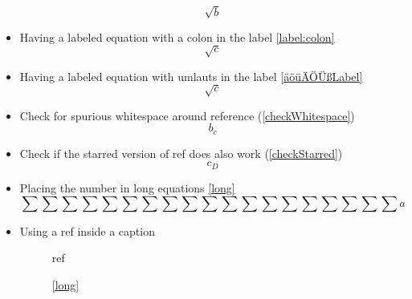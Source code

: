 \documentclass{article}
\def\ifautonum#1{#1}%
\def\ifautonum#1{}%
\def\ifcleveref#1{#1}%
\def\ifcleveref#1{}%
\begin{document}
\begin{itemize}
			\begin{equation}\label{äöüÄÖÜß?:, 3075µ!/§}
				\sqrt{b}
			\end{equation}
		\item Having a labeled equation with a colon in the label \ref{label:colon}
			\begin{equation}\label{label:colon}
				\sqrt{c}
			\end{equation}
		\item Having a labeled equation with umlauts in the label \ref{äöüÄÖÜßLabel}
			\begin{equation}\label{äöüÄÖÜßLabel}
				\sqrt{c}
			\end{equation}
		\item Check for spurious whitespace around reference (\ref{checkWhitespace})
			\begin{equation}\label{checkWhitespace}
				b_c
			\end{equation}
		\item Check if the starred version of ref does also work (\ref*{checkStarred})
			\begin{equation}\label{checkStarred}
				c_D
			\end{equation}
		\ifcleveref{
			\item Check if the starred version of cref does also work (\cref*{checkStarredCref})
				\begin{equation}\label{checkStarredCref}
					d_E
				\end{equation}
		}
		\item Placing the number in long equations \ref{long}
			\begin{equation}\label{long}
				\sum\sum\sum\sum\sum\sum\sum\sum\sum\sum\sum\sum\sum\sum\sum\sum\sum\sum\sum a
			\end{equation}
		\ifautonum{
			\item Printing the number without referencing (needs autonum)
				\begin{equation+}
					E = mgh
				\end{equation+}
		}
		\item Using a ref inside a caption
			\begin{figure}
				ref
				\caption{\ref{long}}
			\end{figure}
		\ifcleveref{
			\item Using a cref inside a caption
				\begin{figure}
					cref
					\caption{\cref{long}}
				\end{figure}
			\item Using cref with one argument
}
\end{itemize}
\end{document}
